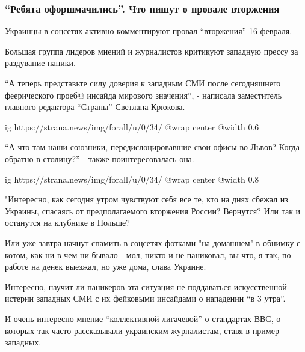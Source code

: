  
 
 
 
 

\subsubsection{\enquote{Ребята офоршмачились}. Что пишут о провале вторжения}
\label{sec:16_02_2022.stz.news.ua.strana.4.putin_ne_napal.2.rebjata}

Украинцы в соцсетях активно комментируют провал \enquote{вторжения} 16 февраля.

Большая группа лидеров мнений и журналистов критикуют западную прессу за
раздувание паники.

\enquote{А теперь представьте силу доверия к западным СМИ после сегодняшнего
феерического проеб@ инсайда мирового значения}, - написала заместитель главного
редактора \enquote{Страны} Светлана Крюкова.

\ifcmt
  ig https://strana.news/img/forall/u/0/34/%
  @wrap center
  @width 0.6
\fi

\enquote{А что там наши союзники, передислоцировавшие свои офисы во Львов? Когда
обратно в столицу?} - также поинтересовалась она.

\ifcmt
  ig https://strana.news/img/forall/u/0/34/%
  @wrap center
  @width 0.8
\fi

"Интересно, как сегодня утром чувствуют себя все те, кто на днях сбежал из
Украины, спасаясь от предполагаемого вторжения России? Вернутся? Или так и
останутся на клубнике в Польше?

Или уже завтра начнут спамить в соцсетях фотками "на домашнем" в обнимку с
котом, как ни в чем ни бывало - мол, никто и не паниковал, вы что, я так, по
работе на денек выезжал, но уже дома, слава Украине.

Интересно, научит ли паникеров эта ситуация не поддаваться искусственной
истерии западных СМИ с их фейковыми инсайдами о нападении \enquote{в 3 утра}.

И очень интересно мнение \enquote{коллективной лигачевой} о стандартах ВВС, о которых
так часто рассказывали украинским журналистам, ставя в пример западных.

